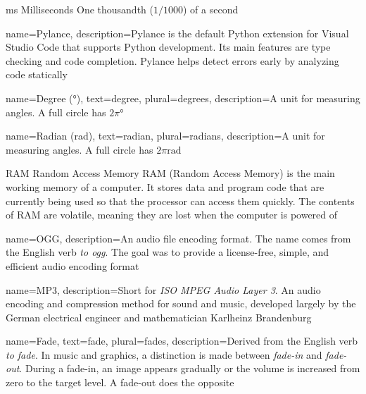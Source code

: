 
	{ms}            %
	{Milliseconds}  %
	{One thousandth ($1/1000$) of a second} %


{
	name={Pylance},
	description={Pylance is the default Python extension for Visual Studio Code that supports Python development. Its main features are type checking and code completion. Pylance helps detect errors early by analyzing code statically}
}

{
	name={Degree (\unit{°})},
	text={degree},
	plural={degrees},
	description={A unit for measuring angles. A full circle has $2\pi °$}
}

{
	name={Radian (rad)},
	text={radian},
	plural={radians},
	description={A unit for measuring angles. A full circle has $2\pi\unit{\radian}$} 
}

	{RAM}            %
	{Random Access Memory}  %
	{RAM (Random Access Memory) is the main working memory of a computer. It stores data and program code that are currently being used so that the processor can access them quickly. The contents of RAM are volatile, meaning they are lost when the computer is powered of} %

{
	name={OGG},
	description={An audio file encoding format. The name comes from the English verb \emph{to ogg}. The goal was to provide a license-free, simple, and efficient audio encoding format} 
}

{
	name={MP3},
	description={Short for \emph{ISO MPEG Audio Layer 3}. An audio encoding and compression method for sound and music, developed largely by the German electrical engineer and mathematician Karlheinz Brandenburg} 
}

{
	name={Fade},
	text={fade},
	plural={fades},
	description={Derived from the English verb \emph{to fade}. In music and graphics, a distinction is made between \emph{fade-in} and \emph{fade-out}. During a fade-in, an image appears gradually or the volume is increased from zero to the target level. A fade-out does the opposite} 
}

